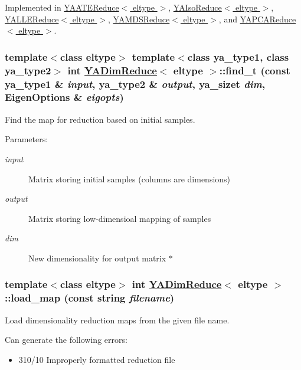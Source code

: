 Implemented in \hyperlink{class_y_a_a_t_e_reduce_a5}{YAATEReduce$<$ eltype $>$}, \hyperlink{class_y_a_iso_reduce_a9}{YAIso\-Reduce$<$ eltype $>$}, \hyperlink{class_y_a_l_l_e_reduce_a8}{YALLEReduce$<$ eltype $>$}, \hyperlink{class_y_a_m_d_s_reduce_a8}{YAMDSReduce$<$ eltype $>$}, and \hyperlink{class_y_a_p_c_a_reduce_a8}{YAPCAReduce$<$ eltype $>$}.\hypertarget{class_y_a_dim_reduce_a5}{
\subsubsection[find\_\-t]{\setlength{\rightskip}{0pt plus 5cm}template$<$class eltype$>$ template$<$class ya\_\-type1, class ya\_\-type2$>$ int \hyperlink{class_y_a_dim_reduce}{YADim\-Reduce}$<$ eltype $>$::find\_\-t (const ya\_\-type1 \& {\em input}, ya\_\-type2 \& {\em output}, ya\_\-sizet {\em dim}, Eigen\-Options \& {\em eigopts})}}
\label{class_y_a_dim_reduce_a5}


Find the map for reduction based on initial samples. 

\begin{Desc}
\item[Parameters:]
\begin{description}
\item[{\em input}]Matrix storing initial samples (columns are dimensions) \item[{\em output}]Matrix storing low-dimensioal mapping of samples \item[{\em dim}]New dimensionality for output matrix $\ast$ \end{description}
\end{Desc}
\hypertarget{class_y_a_dim_reduce_a14}{
\subsubsection[load\_\-map]{\setlength{\rightskip}{0pt plus 5cm}template$<$class eltype$>$ int \hyperlink{class_y_a_dim_reduce}{YADim\-Reduce}$<$ eltype $>$::load\_\-map (const string {\em filename})}}
\label{class_y_a_dim_reduce_a14}


Load dimensionality reduction maps from the given file name. 

Can generate the following errors:\begin{itemize}
\item 310/10 Improperly formatted reduction file\end{itemize}


